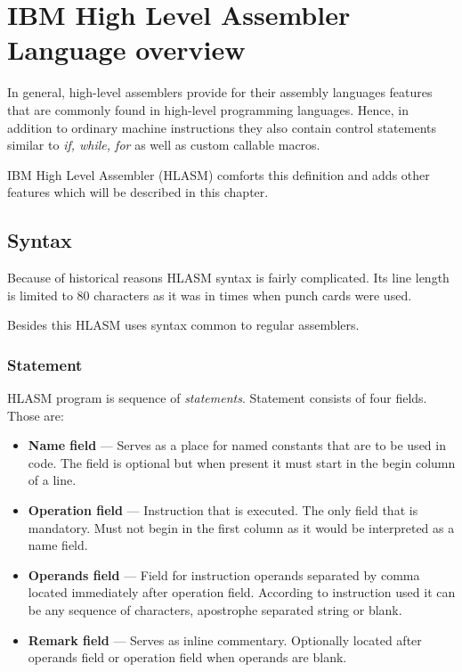 \chapter{IBM High Level Assembler Language overview}

In general, high-level assemblers provide for their assembly languages features that are commonly found in high-level programming languages. Hence, in addition to ordinary machine instructions they also contain control statements similar to \textit{if, while, for} as well as custom callable macros.

IBM High Level Assembler (HLASM) comforts this definition and adds other features which will be described in this chapter.

\section{Syntax}

Because of historical reasons HLASM syntax is fairly complicated. Its line length is limited to 80 characters as it was in times when punch cards were used. 

Besides this HLASM uses syntax common to regular assemblers.

\subsection{Statement}

HLASM program is sequence of \textit{statements}. Statement consists of four fields. Those are:
\begin{itemize}
	\item \textbf{Name field} --- Serves as a place for named constants that are to be used in code. The field is optional but when present it must start in the begin column of a line.
	
	\item \textbf{Operation field} --- Instruction that is executed. The only field that is mandatory. Must not begin in the first column as it would be interpreted as a name field.
	
	\item \textbf{Operands field} --- Field for instruction operands separated by comma located immediately after operation field. According to instruction used it can be any sequence of characters, apostrophe separated string or blank. 
	
	\item \textbf{Remark field} --- Serves as inline commentary. Optionally located after operands field or operation field when operands are blank.
\end{itemize}


